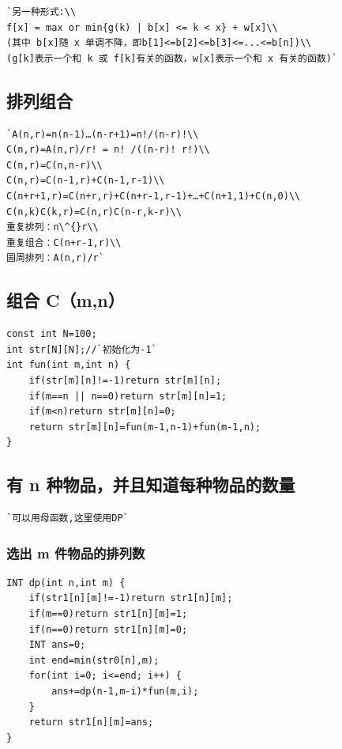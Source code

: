 \documentclass[a4paper]{article}
\begin{document}
\begin{CJK*}{UTF8}{gbsn}
\begin{multicols}{3}
\begin{flushleft}
\begin{lstlisting}
`另一种形式:\\
f[x] = max or min{g(k) | b[x] <= k < x} + w[x]\\
(其中 b[x]随 x 单调不降，即b[1]<=b[2]<=b[3]<=...<=b[n])\\
(g[k]表示一个和 k 或 f[k]有关的函数，w[x]表示一个和 x 有关的函数)`
\end{lstlisting}

\subsection{排列组合}
\begin{lstlisting}
`A(n,r)=n(n-1)…(n-r+1)=n!/(n-r)!\\
C(n,r)=A(n,r)/r! = n! /((n-r)! r!)\\
C(n,r)=C(n,n-r)\\
C(n,r)=C(n-1,r)+C(n-1,r-1)\\
C(n+r+1,r)=C(n+r,r)+C(n+r-1,r-1)+…+C(n+1,1)+C(n,0)\\
C(n,k)C(k,r)=C(n,r)C(n-r,k-r)\\
重复排列：n\^{}r\\
重复组合：C(n+r-1,r)\\
圆周排列：A(n,r)/r`
\end{lstlisting}


\subsection{组合 C（m,n）}
\begin{lstlisting}
const int N=100;
int str[N][N];//`初始化为-1`
int fun(int m,int n) {
    if(str[m][n]!=-1)return str[m][n];
    if(m==n || n==0)return str[m][n]=1;
    if(m<n)return str[m][n]=0;
    return str[m][n]=fun(m-1,n-1)+fun(m-1,n);
}
\end{lstlisting}

\subsection{有 n 种物品，并且知道每种物品的数量}
\begin{lstlisting}
`可以用母函数,这里使用DP`
\end{lstlisting}


\subsubsection{选出 m 件物品的排列数}
\begin{lstlisting}
INT dp(int n,int m) {
    if(str1[n][m]!=-1)return str1[n][m];
    if(m==0)return str1[n][m]=1;
    if(n==0)return str1[n][m]=0;
    INT ans=0;
    int end=min(str0[n],m);
    for(int i=0; i<=end; i++) {
        ans+=dp(n-1,m-i)*fun(m,i);
    }
    return str1[n][m]=ans;
}
\end{lstlisting}


\end{flushleft}
\end{multicols}
\end{CJK*}
\end{document}
